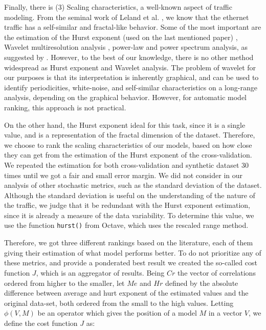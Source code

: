 Finally, there is (3) Scaling characteristics, a well-known aspect of traffic modeling. From the seminal work of Leland et al. \cite{selfsimilar-ethernet}, we know that the ethernet traffic has a self-similar and fractal-like behavior. Some of the most important are the estimation of the Hurst exponent (used on the last mentioned paper) \cite{selfsimilar-ethernet}\cite{multi-player-online-game-self-similarity}\cite{wavelet-analysis-long-range}, Wavelet multiresolution analysis \cite{multi-player-online-game-self-similarity}\cite{wavelet-analysis-long-range}\cite{swing-paper}, power-law and power spectrum analysis, as suggested by \cite{modelling-of-self-similar}. However, to the best of our knowledge, there is no other method widespread as Hurst exponent and Wavelet analysis. The problem of wavelet for our purposes is that its interpretation is inherently graphical, and can be used to identify periodicities, white-noise, and self-similar characteristics on a long-range analysis, depending on the graphical behavior. However, for automatic model ranking, this approach is not practical.


On the other hand, the Hurst exponent ideal for this task, since it is a single value, and is a representation of the fractal dimension of the dataset.  Therefore, we choose to rank the scaling characteristics of our models, based on how close they can get from the estimation of the Hurst exponent of the cross-validation. We repeated the estimation for both cross-validation and synthetic dataset 30 times until we got a fair and small error margin. We did not consider in our analysis of other stochastic metrics,  such as the standard deviation of the dataset. Although the standard deviation is useful on the understanding of the nature of the traffic, we judge that it be redundant with the Hurst exponent estimation, since it is already a measure of the data variability. To determine this value, we use the function \texttt{hurst()} from Octave, which uses the rescaled range method. 

Therefore, we got three different rankings based on the literature, each of them giving their estimation of what model performs better. To do not prioritize any of these metrics, and provide a ponderated best result we created the so-called cost function $J$, which is an aggregator of results. Being $Cr$ the vector of correlations ordered from higher to the smaller, let $Me$ and $Hr$ defined by the absolute difference between average and hurt exponent of the estimated values and the original data-set, both ordered from the small to the high values. Letting $\phi(V, M)$ be an operator which gives the position of a model $M$ in a vector $V$, we define the cost function $J$ as:

